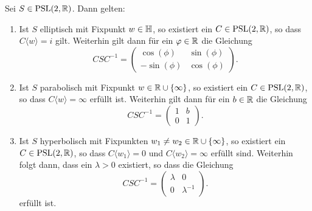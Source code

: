 \begin{lemma}
  \label{lemma:psl-trafo}
  Sei $S \in \operatorname{PSL}(2, \mathbb{R})$. Dann gelten:
  \begin{enumerate}
  \item Ist $S$ elliptisch mit Fixpunkt $w \in \mathbb{H}$, so existiert ein $C \in \operatorname{PSL}(2, \mathbb{R})$, so
    dass $C\langle w \rangle = i$ gilt. Weiterhin gilt dann für ein
    $\varphi \in \mathbb{R}$ die Gleichung
    \[
    C S C^{-1} =
    \begin{pmatrix}
      \cos(\phi) & \sin(\phi) \\
      -\sin(\phi) & \cos(\phi)
    \end{pmatrix}.
    \]
  \item Ist $S$ parabolisch mit Fixpunkt $w \in \mathbb{R} \cup \{\infty\}$,
    so existiert ein $C \in \operatorname{PSL}(2, \mathbb{R})$, so dass $C\langle w\rangle =
    \infty$ erfüllt ist. Weiterhin gilt dann für ein $b \in \mathbb{R}$ die Gleichung
    \[
    C S C^{-1} =
    \begin{pmatrix}
      1 & b\\
      0 & 1
    \end{pmatrix}.
    \]
  \item Ist $S$ hyperbolisch mit Fixpunkten $w_1 \neq w_2 \in \mathbb{R} \cup
    \{\infty\}$, so existiert ein \break$C \in \operatorname{PSL}(2, \mathbb{R})$, so dass $C\langle
    w_1 \rangle = 0$ und $C\langle w_2 \rangle = \infty$ erfüllt
    sind. Weiterhin folgt dann, dass ein $\lambda > 0$ existiert, so dass
    die Gleichung
    \[
    C S C^{-1} = 
    \begin{pmatrix}
      \lambda & 0\\
      0 & \lambda^{-1}
    \end{pmatrix}.
    \]
    erfüllt ist.
  \end{enumerate}
\end{lemma}

